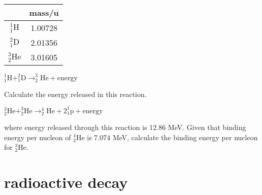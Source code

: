 \begin{marginfigure}
	\vspace*{-21pt}
	\flushright
	\begin{tabular}{|c|c|}
		\hline
		& mass/u \\ \hline
		\rule[-1em]{0pt}{3em}$^1_1\text{H}$ & 1.00728 \\ \hline
		\rule[-1em]{0pt}{3em}$^2_1\text{D}$ & 2.01356 \\ \hline 
		\rule[-1em]{0pt}{3em}$^3_2\text{He}$ & 3.01605 \\ \hline
	\end{tabular}
	\vspace*{-10pt}
\end{marginfigure}




{

\centering

$ ^1_1\text{H} + ^2_1\text{D} \longrightarrow ^3_2\text{He} + \text{energy}$

}
	
\noindent Calculate the energy released in this reaction.



\newpage




{
	
	\centering

	$^3_2\text{He} + ^3_2\text{He} \longrightarrow ^4_2\text{He} + 2 ^1_1\text{p} +\text{energy}$	
	
}

\noindent where energy released through this reaction is 12.86 MeV. Given that binding energy per nucleon of $^4_2\text{He}$ is 7.074 MeV, calculate the binding energy per nucleon for $^3_2\text{He}$.





\section{radioactive decay}


